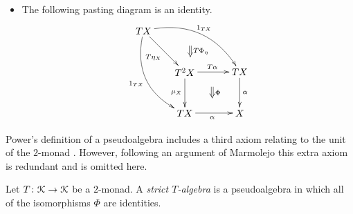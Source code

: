 \begin{Defi}
\begin{itemize}
    \item The following pasting diagram is an identity.
    \[
        \xy
            (0,0)*+{TX}="txl1";
            (15,-15)*+{T^2X}="t2x";
            (15,-30)*+{TX}="txl2";
            (35,-15)*+{TX}="txl3";
            (35,-30)*+{X}="xl";
            {\ar@/^1.7pc/^{1_{TX}} "txl1" ; "txl3"};
            {\ar@/_1.7pc/_{1_{TX}} "txl1" ; "txl2"};
            {\ar_{T\eta_X} "txl1" ; "t2x"};
            {\ar^{T\alpha} "t2x" ; "txl3"};
            {\ar_{\mu_X} "t2x" ; "txl2"};
            {\ar_{\alpha} "txl2" ; "xl"};
            {\ar^{\alpha} "txl3" ; "xl"};
            {\ar@{=>}^{T\Phi_\eta} (17,-5.5) ; (17,-9.5)};
            {\ar@{=>}^{\Phi} (25,-20.5) ; (25,-24.5)};
        \endxy
    \]

    \end{itemize}
\end{Defi}

\begin{rem}\label{rem:third-axiom}
Power's definition of a pseudoalgebra includes a third axiom relating to the unit of the $2$-monad \cite[Definition 2.4, Axiom 2.1]{power-gen}. However, following an argument of Marmolejo \cite[Lemma 9.1]{marm-doct} this extra axiom is redundant and is omitted here.
\end{rem}

\begin{Defi}\label{Defi:strictalgebra}
Let $T \colon \mathcal{K} \rightarrow \mathcal{K}$ be a $2$-monad. A \textit{strict $T$-algebra} is a pseudoalgebra in which all of the isomorphisms $\Phi$ are identities.
\end{Defi}

